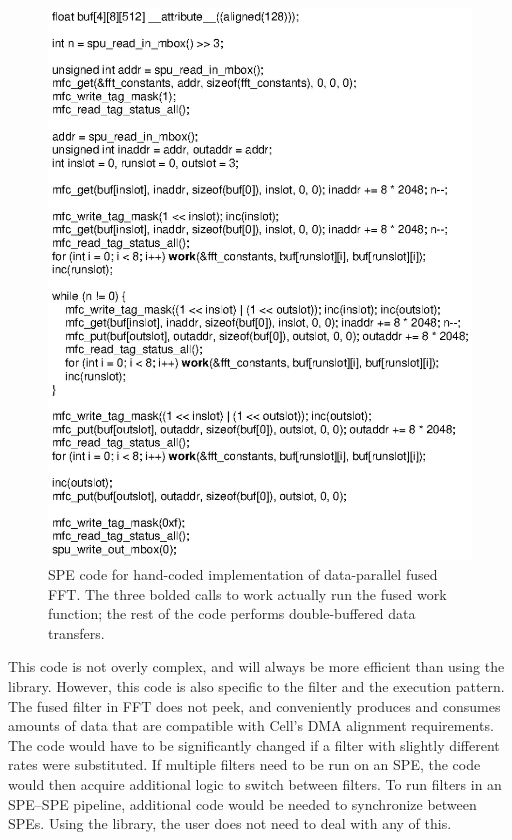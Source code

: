 \begin{figure}[!htb]
\begin{center}
\includegraphics{figs/handcode}
\end{center}
\caption[SPE code for hand-coded implementation of data-parallel fused FFT.]{SPE code for hand-coded implementation of data-parallel fused FFT. The three bolded calls to \textsf{work} actually run the fused work function; the rest of the code performs double-buffered data transfers.}
\label{fig:use:handcode}
\end{figure}

This code is not overly complex, and will always be more efficient than using the library. However, this code is also specific to the filter and the execution pattern. The fused filter in FFT does not peek, and conveniently produces and consumes amounts of data that are compatible with Cell's DMA alignment requirements. The code would have to be significantly changed if a filter with slightly different rates were substituted. If multiple filters need to be run on an SPE, the code would then acquire additional logic to switch between filters. To run filters in an SPE--SPE pipeline, additional code would be needed to synchronize between SPEs. Using the library, the user does not need to deal with any of this.

